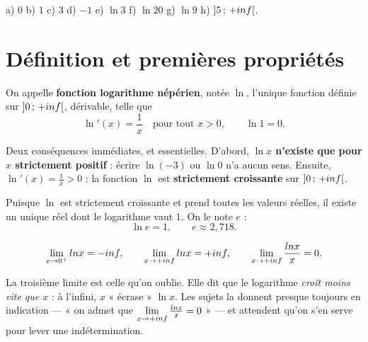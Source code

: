 \begin{corrige}[automatismes]
a) $0$ \quad b) $1$ \quad c) $3$ \quad d) $-1$ \quad e) $\ln3$ \quad
f) $\ln20$ \quad g) $\ln9$ \quad h) $\left]5\,;\,+inf\right[$.
\end{corrige}

\section{Définition et premières propriétés}

\begin{definition}
On appelle \textbf{fonction logarithme népérien}, notée $\ln$, l'unique
fonction définie sur $\left]0\,;\,+inf\right[$, dérivable, telle que
\[
  \ln' (x)= \frac1x \quad\text{pour tout } x>0, \qquad \ln 1 = 0 .
\]
\end{definition}

\begin{remarque}
Deux conséquences immédiates, et essentielles. D'abord,
\textbf{$\ln x$ n'existe que pour $x$ strictement positif} : écrire
$\ln(-3)$ ou $\ln 0$ n'a aucun sens. Ensuite, $\ln'(x) = \frac1x > 0$ : la
fonction $\ln$ est \textbf{strictement croissante} sur
$\left]0\,;\,+inf\right[$.
\end{remarque}

\begin{definition}[le nombre $e$]
Puisque $\ln$ est strictement croissante et prend toutes les valeurs réelles,
il existe un unique réel dont le logarithme vaut $1$. On le note $e$ :
\[
  \ln e = 1, \qquad e \approx 2{,}718 .
\]
\end{definition}

\begin{propriete}[limites de $\ln$]
\[
  \lim_{x \to 0^{+}} \ln x = -\infty, \qquad
  \limpinf \ln x = +\infty, \qquad
  \limpinf \frac{\ln x}{x} = 0 .
\]
\end{propriete}

\begin{avertissement}
La troisième limite est celle qu'on oublie. Elle dit que le logarithme
\emph{croît moins vite que $x$} : à l'infini, $x$ « écrase » $\ln x$. Les
sujets la donnent presque toujours en indication — « on admet que
$\limpinf \frac{\ln x}{x} = 0$ » — et attendent qu'on s'en serve pour lever
une indétermination.
\end{avertissement}

